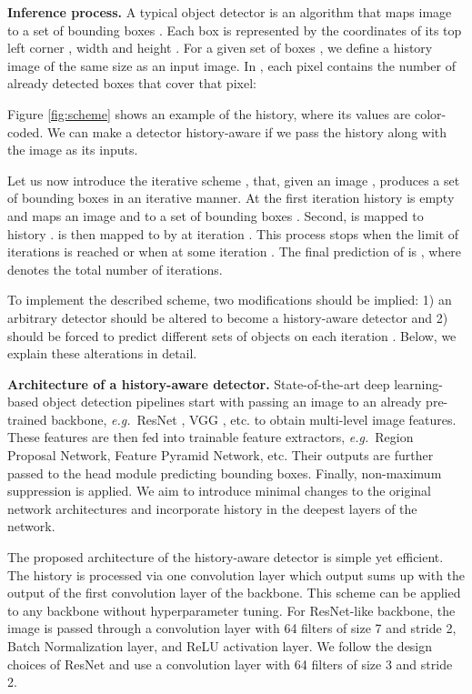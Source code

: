 \documentclass[runningheads]{llncs}
\newcommand{\eg}{\emph{e.g.}\ }
\begin{document}
\textbf{Inference process.} A typical object detector  is an algorithm that maps image  to a set of bounding boxes . Each box is represented by the coordinates of its top left corner , width  and height . For a given set of boxes , we define a history image  of the same size as an input image. In , each pixel contains the number of already detected boxes that cover that pixel:

Figure \ref{fig:scheme} shows an example of the history, where its values are color-coded. We can make a detector  history-aware if we pass the history  along with the image  as its inputs.

Let us now introduce the iterative scheme , that, given an image , produces a set of bounding boxes  in an iterative manner. At the first iteration  history  is empty and  maps an image  and  to a set of bounding boxes . Second,  is mapped to history .  is then mapped to  by  at iteration . This process stops when the limit of iterations is reached or when  at some iteration . The final prediction of  is , where  denotes the total number of iterations.

To implement the described scheme, two modifications should be implied: 1) an arbitrary detector  should be altered to become a history-aware detector  and 2)  should be forced to predict different sets of objects  on each iteration . Below, we explain these alterations in detail.

\textbf{Architecture of a history-aware detector.} State-of-the-art deep learning-based object detection pipelines start with passing an image to an already pre-trained backbone, \eg ResNet \cite{he2015deep}, VGG \cite{simonyan2014very}, etc. to obtain multi-level image features. These features are then fed into trainable feature extractors, \eg Region Proposal Network, Feature Pyramid Network, etc. Their outputs are further passed to the head module predicting bounding boxes. Finally, non-maximum suppression is applied. We aim to introduce minimal changes to the original network architectures and incorporate history in the deepest layers of the network.

The proposed architecture of the history-aware detector is simple yet efficient. The history is processed via one convolution layer which output sums up with the output of the first convolution layer of the backbone. This scheme can be applied to any backbone without hyperparameter tuning. For ResNet-like backbone, the image is passed through a convolution layer with 64 filters of size 7 and stride 2, Batch Normalization layer, and ReLU activation layer. We follow the design choices of ResNet and use a convolution layer with 64 filters of size 3 and stride 2.
\end{document}
